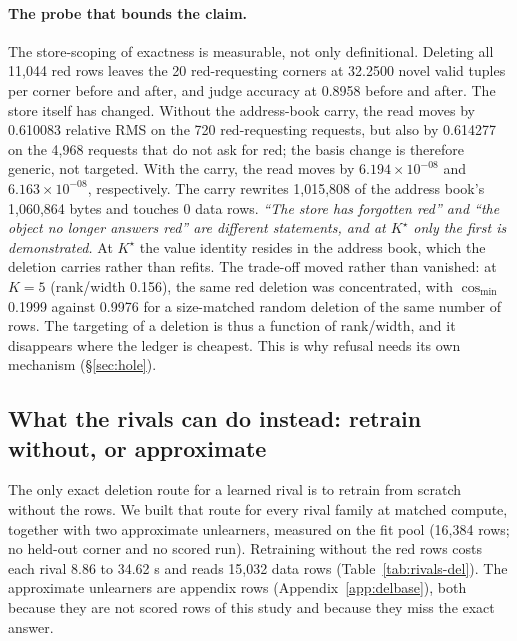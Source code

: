 \documentclass{article} %
\newcommand{\sci}[2]{\ensuremath{#1\times10^{#2}}}
\newcommand{\Kstar}{\ensuremath{K^{\star}}}
\begin{document}
\paragraph{The probe that bounds the claim.} The store-scoping of exactness is measurable, not
only definitional. Deleting all 11,044 red rows leaves the 20 red-requesting corners at 32.2500
novel valid tuples per corner before and after, and judge accuracy at 0.8958 before and after.
The store itself has changed. Without the address-book carry, the read moves by 0.610083
relative RMS on the 720 red-requesting requests, but also by 0.614277 on the 4,968 requests
that do not ask for red; the basis change is therefore generic, not targeted. With the carry,
the read moves by \sci{6.194}{-08} and \sci{6.163}{-08}, respectively. The carry rewrites
1,015,808 of the address book's 1,060,864 bytes and touches 0 data rows. %
\emph{``The store has forgotten red'' and ``the object no longer answers red'' are different
statements, and at $\Kstar$ only the first is demonstrated.} At $\Kstar$ the value identity
resides in the address book, which the deletion carries rather than refits. The trade-off moved
rather than vanished: at $K=5$ (rank/width 0.156), the same red deletion was concentrated, with
$\cos_{\min}$ 0.1999 against 0.9976 for a size-matched random deletion of the same number of
rows. %
The targeting of a deletion is thus a function of rank/width, and it disappears where the ledger
is cheapest. This is why refusal needs its own mechanism (\S\ref{sec:hole}).

\subsection{What the rivals can do instead: retrain without, or approximate}
\label{sec:del-comparators}

The only exact deletion route for a learned rival is to retrain from scratch without the rows.
We built that route for every rival family at matched compute, together with two approximate
unlearners, measured on the fit pool (16,384 rows; no held-out corner and no scored run).
Retraining without the red rows costs each rival 8.86 to 34.62 s and reads 15,032 data rows
(Table~\ref{tab:rivals-del}). The approximate unlearners are appendix rows
(Appendix~\ref{app:delbase}), both because they are not scored rows of this study and because
they miss the exact answer. %
\end{document}
